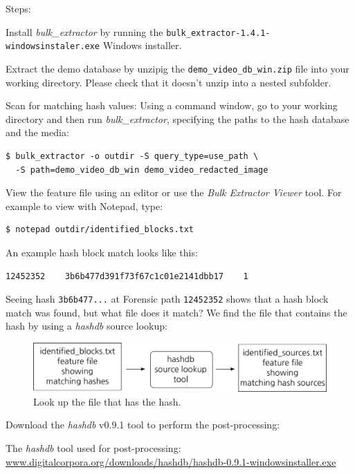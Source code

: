\documentclass[12pt,twoside]{article}
\newcommand{\hdb}{\emph{hashdb}\xspace}
\newcommand{\bulk}{\emph{bulk\_extractor}\xspace}
\newcommand{\bev}{\emph{Bulk Extractor Viewer}\xspace}
\begin{document}
Steps:
\begin{compactenum}
\item Install \bulk by running the
\texttt{bulk\_extractor-1.4.1-windowsinstaler.exe} Windows installer.
\item Extract the demo database
by unzipig the \texttt{demo\_video\_db\_win.zip} file
into your working directory.
Please check that it doesn't unzip into a nested subfolder.
\item Scan for matching hash values: Using a command window, go to your working directory and then run \bulk,
specifying the paths to the hash database and the media:
\begin{verbatim}
$ bulk_extractor -o outdir -S query_type=use_path \
  -S path=demo_video_db_win demo_video_redacted_image
\end{verbatim}
\item View the feature file using an editor or use the \bev tool.
For example to view with Notepad, type:
\begin{verbatim}
$ notepad outdir/identified_blocks.txt
\end{verbatim}
An example hash block match looks like this:
\begin{verbatim}
12452352    3b6b477d391f73f67c1c01e2141dbb17    1
\end{verbatim}
\end{compactenum}

Seeing hash \texttt{3b6b477...} at Forensic path \texttt{12452352}
shows that a hash block match was found, but what file does it match?
We find the file that contains the hash by using a \hdb source lookup:
\begin{figure}[H]
  \center
  \includegraphics[scale=0.6]{drawings/source_lookup}
  \caption*{Look up the file that has the hash.}
  \label{fig:source_lookup}
\end{figure}

Download the \hdb v0.9.1 tool to perform the post-processing:
\begin{compactitem}
\item The \hdb tool used for post-processing:
\url{www.digitalcorpora.org/downloads/hashdb/hashdb-0.9.1-windowsinstaller.exe}
\end{compactitem}
\end{document}

